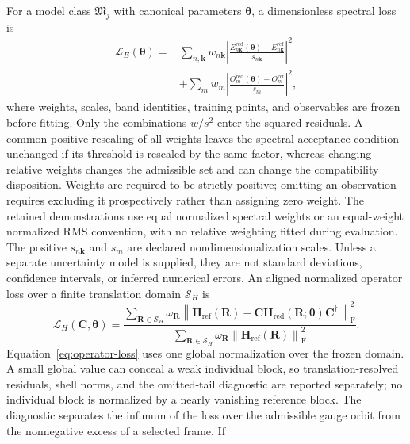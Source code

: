 \documentclass[preprint,12pt]{elsarticle}
\begin{document}
For a model class $\mathfrak{M}_j$ with canonical parameters
$\bm{\theta}$, a dimensionless spectral loss is
\begin{equation}
\begin{split}
 \mathcal{L}_E(\bm{\theta})={}&
 \sum_{n,\bm{k}}w_{n\bm{k}}
 \left|
 \frac{E_{n\bm{k}}^{\mathrm{red}}(\bm{\theta})
 -E_{n\bm{k}}^{\mathrm{ref}}}{s_{n\bm{k}}}
 \right|^2\\
 &+\sum_m w_m
 \left|
 \frac{O_m^{\mathrm{red}}(\bm{\theta})-O_m^{\mathrm{ref}}}{s_m}
 \right|^2,
\end{split}
\label{eq:spectral-loss}
\end{equation}
where weights, scales, band identities, training points, and observables are
frozen before fitting. Only the combinations $w/s^2$ enter the squared
residuals. A common positive rescaling of all weights leaves the spectral
acceptance condition unchanged if its threshold is rescaled by the same factor,
whereas changing relative weights changes the admissible set and can change the
compatibility disposition. Weights are required to be strictly positive;
omitting an observation requires excluding it prospectively rather than assigning
zero weight. The retained demonstrations use equal normalized spectral weights or
an equal-weight normalized RMS convention, with no relative weighting fitted during
evaluation. The positive $s_{n\bm{k}}$ and $s_m$ are declared
nondimensionalization scales. Unless a separate uncertainty model is supplied,
they are not standard deviations, confidence intervals, or inferred numerical
errors. An aligned normalized operator loss over a finite translation domain
$\mathcal{S}_H$ is
\begin{equation}
 \mathcal{L}_H(\bm{C},\bm{\theta})
 =
 \frac{
 \displaystyle\sum_{\bm{R}\in\mathcal{S}_H}\omega_{\bm{R}}
 \left\|\bm{H}_{\mathrm{ref}}(\bm{R})
 -\bm{C}\bm{H}_{\mathrm{red}}(\bm{R};\bm{\theta})
 \bm{C}^{\dagger}\right\|_{\mathrm{F}}^2
 }{
 \displaystyle\sum_{\bm{R}\in\mathcal{S}_H}\omega_{\bm{R}}
 \left\|\bm{H}_{\mathrm{ref}}(\bm{R})\right\|_{\mathrm{F}}^2
 }.
 \label{eq:operator-loss}
\end{equation}
Equation~\eqref{eq:operator-loss} uses one global normalization over the frozen
domain. A small global value can conceal a weak individual block, so
translation-resolved residuals, shell norms, and the omitted-tail diagnostic
are reported separately; no individual block is normalized by a nearly
vanishing reference block. The diagnostic separates the infimum of the loss over
the admissible gauge orbit from the nonnegative excess of a selected frame. If
\end{document}
